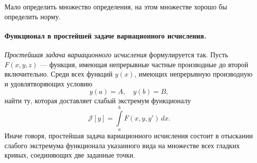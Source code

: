 Мало определить множество определения, на этом множестве хорошо бы определить
норму. 


\paragraph{Функционал в простейшей задаче вариационного
исчисления.} \emph{Простейшая задача вариационного исчисления} формулируется
так. Пусть $ F(x, y, z) $ --- функция, имеющая непрерывные частные производные
до второй включительно. Среди всех функций $ y(x) $, имеющих непрерывную
производную и удовлятворяющих условию  
\[
    y(a) = A, \quad y(b) = B,
\]
найти ту, которая доставляет слабый экстремум функционалу  
\begin{equation}\label{eq:func}
  \mathscr{J}[y] = \int\limits_{a}^{b}F(x, y, y')\,dx.
\end{equation}
Иначе говоря, простейшая задача вариационного исчисления состоит
в отыскании слабого экстремума функционала указанного вида на множестве
всех гладких кривых, соединяющих две заданные точки.


